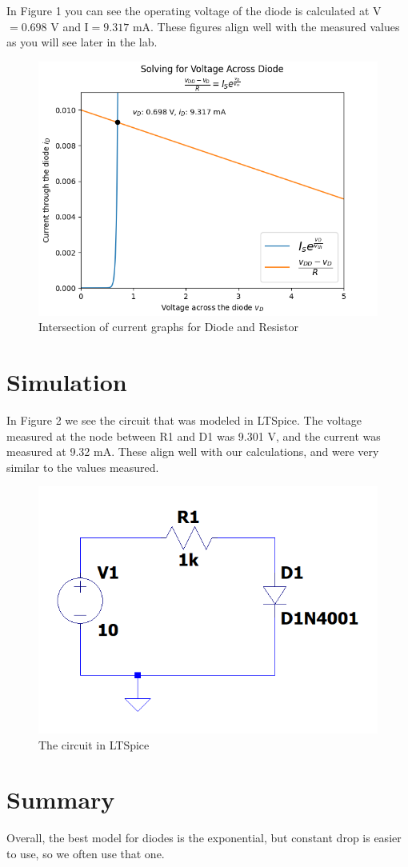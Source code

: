 \documentclass{article}
\begin{document}
In Figure 1 you can see the operating voltage of the diode is
calculated at V$=0.698$ V and I$=9.317$ mA. These figures align 
well with the measured values as you will see later in the lab.

\begin{figure}
  \includegraphics[width=0.7\linewidth]{out.png}
  \caption{Intersection of current graphs for Diode and Resistor}
  \label{fig:graph1}
\end{figure} 

\section{Simulation}
In Figure 2 we see the circuit that was modeled in LTSpice. The voltage
measured at the node between R1 and D1 was 9.301 V, and the current
was measured at 9.32 mA. These align well with our calculations, and were
very similar to the values measured.
\begin{figure}
  \includegraphics[width=0.7\linewidth]{circuit.png}
  \caption{The circuit in LTSpice}
  \label{fig:circuit1}
\end{figure} 

\section{Summary}
Overall, the best model for diodes is the exponential, but constant
drop is easier to use, so we often use that one.
\end{document}
